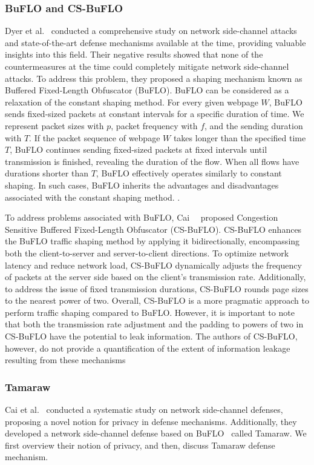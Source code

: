 \subsubsection{BuFLO and CS-BuFLO}\label{subsubsec:buflo}
Dyer et al.~\cite{dyer2012peek} conducted a comprehensive study on network side-channel attacks and state-of-the-art defense mechanisms available at the time, providing valuable insights into this field. 
Their negative results showed that none of the countermeasures at the time could completely mitigate network side-channel attacks.
To address this problem, they proposed a shaping mechanism known as Buffered Fixed-Length Obfuscator (BuFLO).
BuFLO can be considered as a relaxation of the constant shaping method.
For every given webpage $W$, BuFLO sends fixed-sized packets at constant intervals for a specific duration of time.
We represent packet sizes with $p$, packet frequency with $f$, and the sending duration with $T$. 
If the packet sequence of webpage $W$ takes longer than the specified time $T$, BuFLO continues sending fixed-sized packets at fixed intervals until transmission is finished, revealing the duration of the flow. 
When all flows have durations shorter than $T$, BuFLO effectively operates similarly to constant shaping.
In such cases, BuFLO inherits the advantages and disadvantages associated with the constant shaping method.
.

To address problems associated with BuFLO, Cai~\etal~\cite{cai2014cs} proposed Congestion Sensitive Buffered Fixed-Length Obfuscator (CS-BuFLO).
CS-BuFLO enhances the BuFLO traffic shaping method by applying it bidirectionally, encompassing both the client-to-server and server-to-client directions. 
To optimize network latency and reduce network load, CS-BuFLO dynamically adjusts the frequency of packets at the server side based on the client's transmission rate.
Additionally, to address the issue of fixed transmission durations, CS-BuFLO rounds page sizes to the nearest power of two. 
Overall, CS-BuFLO is a more pragmatic approach to perform traffic shaping compared to BuFLO. 
However, it is important to note that both the transmission rate adjustment and the padding to powers of two in CS-BuFLO have the potential to leak information.
The authors of CS-BuFLO, however, do not provide a quantification of the extent of information leakage resulting from these mechanisms


\subsubsection{Tamaraw}
Cai et al.~\cite{cai2014systematic} conducted a systematic study on network side-channel defenses, proposing a novel notion for privacy in defense mechanisms.
Additionally, they developed a network side-channel defense based on BuFLO~\cite{dyer2012peek} called Tamaraw. 
We first overview their notion of privacy, and then, discuss Tamaraw defense mechanism.


